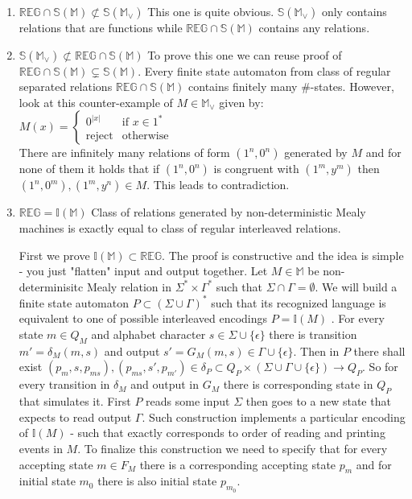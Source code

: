 \documentclass[12pt]{article}
\begin{document}
\begin{enumerate}
\item $\mathbb{REG} \cap \mathbb{S}(\mathbb{M}) \not\subset \mathbb{S}(\mathbb{M}_\vee)$  This one is quite obvious. $\mathbb{S}(\mathbb{M}_\vee)$ only contains relations that are  functions while $\mathbb{REG} \cap \mathbb{S}(\mathbb{M})$ contains any relations.  

\item $\mathbb{S}(\mathbb{M}_\vee)\not\subset\mathbb{REG} \cap\mathbb{S}(\mathbb{M})$ To prove this one we can reuse proof of $\mathbb{REG} \cap \mathbb{S}(\mathbb{M}) \subsetneq \mathbb{S}(\mathbb{M})$. Every finite state automaton from class of regular separated relations $\mathbb{REG} \cap \mathbb{S}(\mathbb{M})$ contains finitely many $\#$-states. However, look at this counter-example of $M \in \mathbb{M}_\vee$ given by: \\
$M(x) = \begin{cases}
0^{\vert x \vert} & \mbox{if }  x  \in 1^*   \\
\mbox{reject} & \mbox{otherwise} 
\end{cases}$ \\
There are infinitely many relations of form $(1^n,0^n)$  generated by $M$ and for none of them it holds that if $(1^n,0^n)$ is congruent with $(1^m,y^m)$ then $(1^n,0^m), (1^m,y^n)  \in M$. This leads to contradiction.


\item $\mathbb{REG} = \mathbb{I}(\mathbb{M})$  Class of relations generated by non-deterministic Mealy machines is exactly equal to class of regular interleaved relations. 

First we prove $\mathbb{I}(\mathbb{M})  \subset \mathbb{REG} $. The proof is constructive and the idea is simple - you just "flatten" input and output together. Let $M \in \mathbb{M}$ be non-determinisitc Mealy relation in $\Sigma^* \times \Gamma^*$ such that $\Sigma \cap \Gamma = \emptyset$. We will build a finite state automaton $P \subset (\Sigma \cup \Gamma)^*$ such that its recognized language is equivalent to one of possible interleaved encodings $ P = \mathbb{I}(M)$ . For every state $m \in Q_M$ and alphabet character $s \in \Sigma \cup \{\epsilon\}$ there is transition $m' = \delta_M(m,s)$ and output $s' = G_M(m,s) \in \Gamma \cup \{\epsilon\}$. Then in $P$ there shall exist $(p_m,s,p_{ms}), (p_{ms},s',p_{m'}) \in \delta_P \subset Q_P \times (\Sigma \cup \Gamma \cup \{\epsilon\}) \rightarrow Q_P$. So for every transition in $\delta_M$ and output in $G_M$ there is corresponding state in $Q_P$ that simulates it. First $P$ reads some input $\Sigma$ then goes to a new state that expects to read output $\Gamma$. Such construction implements a particular encoding of $\mathbb{I}(M)$ - such that exactly corresponds to order of reading and printing events in $M$. To finalize this construction we need to specify that for every accepting state $m \in F_M$ there is a corresponding accepting state $p_m$ and for initial state $m_0$ there is also initial state $p_{m_0}$. 
 

\end{enumerate}
\end{document}
